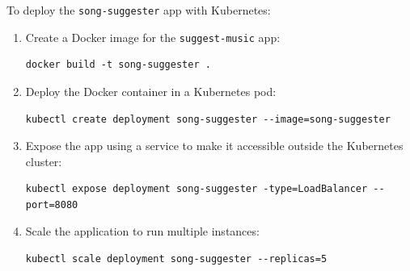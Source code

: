 \documentclass[a4paper,11pt]{article}
\begin{document}
To deploy the \verb|song-suggester| app with Kubernetes:
\begin{enumerate}
    \item   Create a Docker image for the \verb|suggest-music| app:
            \begin{verbatim}
docker build -t song-suggester .
            \end{verbatim}
    \item   Deploy the Docker container in a Kubernetes pod:
            \begin{verbatim}
kubectl create deployment song-suggester --image=song-suggester
            \end{verbatim}
    \item   Expose the app using a service to make it accessible outside the Kubernetes cluster:
            \begin{verbatim}
kubectl expose deployment song-suggester -type=LoadBalancer -- port=8080
            \end{verbatim}
    \item   Scale the application to run multiple instances:
            \begin{verbatim}
kubectl scale deployment song-suggester --replicas=5
            \end{verbatim}
\end{enumerate}
\end{document}

